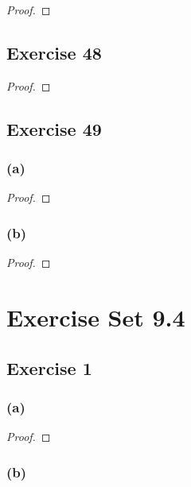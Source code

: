 \documentclass[14pt]{extarticle}
\begin{document}
\begin{proof}

\end{proof}

\subsection{Exercise 48}

\begin{proof}

\end{proof}

\subsection{Exercise 49}

\subsubsection{(a)}

\begin{proof}

\end{proof}

\subsubsection{(b)}

\begin{proof}

\end{proof}

\section{Exercise Set 9.4}

\subsection{Exercise 1}

\subsubsection{(a)}

\begin{proof}

\end{proof}

\subsubsection{(b)}
\end{document}
